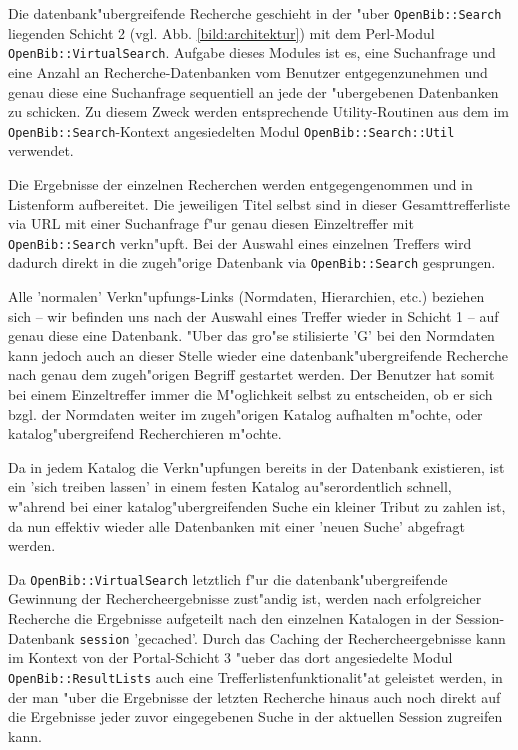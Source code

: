 \documentclass[11pt, twoside, a4paper, BCOR8mm, DIV12, bibtotoc,idxtotoc]{scrbook}
\begin{document}
Die datenbank"ubergreifende Recherche geschieht in der "uber
\texttt{OpenBib::Search} liegenden Schicht 2 (vgl. Abb.
\ref{bild:architektur}) mit dem Perl-Modul
\texttt{OpenBib::VirtualSearch}. Aufgabe dieses Modules ist es, eine
Suchanfrage und eine Anzahl an Recherche-Datenbanken vom Benutzer
entgegen\-zuneh\-men und genau diese eine Suchanfrage sequentiell an
jede der "ubergebenen Datenbanken zu schicken. Zu diesem Zweck werden
entsprechende Utility-Routinen aus dem im
\texttt{OpenBib::Search}-Kontext angesiedelten Modul
\texttt{OpenBib::Search::Util} verwendet.

Die Ergebnisse der einzelnen Recherchen werden entgegengenommen und in
Listenform auf\-be\-rei\-tet. Die jeweiligen Titel selbst sind in dieser
Gesamttrefferliste via URL mit einer Suchanfrage f"ur genau diesen
Einzeltreffer mit \texttt{OpenBib::Search} verkn"upft. 
Bei der
Auswahl eines einzelnen Treffers wird dadurch direkt in die
zugeh"orige Datenbank via \texttt{OpenBib::Search} gesprungen. 

Alle 'normalen' Verkn"upfungs-Links (Normdaten, Hierarchien, etc.)
beziehen sich -- wir befinden uns nach der Auswahl eines Treffer wieder in
Schicht 1 -- auf genau diese eine Datenbank. "Uber das gro"se
stilisierte 'G' bei den Normdaten kann jedoch auch an dieser Stelle
wieder eine datenbank"ubergreifende Recherche nach genau dem
zugeh"origen Begriff gestartet werden. Der Benutzer hat somit bei
einem Einzeltreffer immer die M"oglichkeit selbst zu entscheiden, ob
er sich bzgl. der Normdaten weiter im zugeh"origen Katalog aufhalten
m"ochte, oder katalog"ubergreifend Recherchieren m"ochte.

Da in jedem Katalog die Verkn"upfungen bereits in der Datenbank
existieren, ist ein 'sich treiben lassen' in einem festen Katalog
au"ser\-ordentlich schnell, w"ahrend bei einer katalog"ubergreifenden
Suche ein kleiner Tribut zu zahlen ist, da nun effektiv wieder alle
Datenbanken mit einer 'neuen Suche' abgefragt werden.

Da \texttt{OpenBib::VirtualSearch} letztlich f"ur die
datenbank"ubergreifende Gewinnung der Recherche\-er\-geb\-nisse
zust"andig ist, werden nach erfolgreicher Recherche die Ergebnisse
aufgeteilt nach den einzelnen Katalogen in der Session-Datenbank
\texttt{session} 'gecached'. Durch das Caching der
Re\-cher\-che\-ergebnisse kann im Kontext von der Portal-Schicht 3
"ueber das dort angesiedelte Modul \texttt{OpenBib::ResultLists} auch
eine Trefferlistenfunktionalit"at geleistet werden, in der man "uber
die Ergebnisse der letzten Recherche hinaus auch noch direkt auf die
Ergebnisse jeder zuvor eingegebenen Suche in der aktuellen Session
zugreifen kann.
\end{document}
